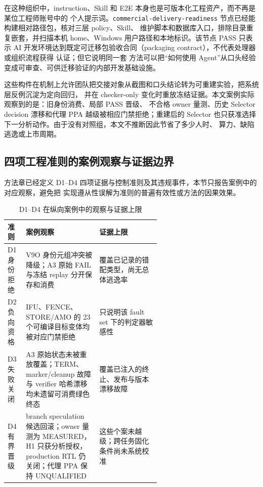 \documentclass[UTF8,a4paper,zihao=-4,oneside]{ctexart}
\begin{document}
在这种组织中，instruction、Skill 和 E2E 本身也是可版本化工程资产，而不再是某位工程师账号中的
个人提示词。\texttt{commercial-delivery-readiness} 节点已经能构建相对路径包，核对三层 policy、Skill、
维护脚本和数据库入口，排除目录重复嵌套，并扫描本机 home、Windows 用户路径和本地标识。该节点 PASS
只表示 AI 开发环境达到既定可迁移包验收合同（packaging contract），不代表处理器或组织流程获得
认证；但它说明同一套
方法可以把“如何使用 Agent”从口头经验变成可审查、可供迁移验证的内部开发基础设施。

这些构件在机制上允许团队把交接对象从截图和口头结论转为可重建实验，把系统层反例沉淀为定向回归，
并在 checker-only 变化时重放冻结证据。本文案例实际观察到的是：旧身份消费、局部 PASS 晋级、
不合格 owner 量测、历史 Selector decision 漂移和代理 PPA 越级被相应门禁拒绝；重建后的 Selector
也只获准选择下一分析动作。由于没有对照组，本文不推断因此节省了多少人时、
算力、缺陷逃逸或上市周期。

\subsection{四项工程准则的案例观察与证据边界}

方法章已经定义 D1--D4 四项证据与控制准则及其违规事件，本节只报告案例中的对应观察，避免把
实现遵从性误解为准则的普遍有效性或方法的因果效果。

\begin{table}[htbp]
  \centering
  \small
  \caption{D1--D4 在纵向案例中的观察与证据上限}
  \label{tab:design-guideline-observations}
  \begin{tabularx}{\linewidth}{@{}L{0.12\linewidth}L{0.48\linewidth}Y@{}}
    \toprule
    准则 & 案例观察 & 证据上限 \\
    \midrule
    D1 身份拒绝 & V9O 身份元组冲突被降级；A3 原始 FAIL 与冻结 replay 分开保存和消费 & 覆盖已记录的错配类型，尚无总体逃逸率 \\
    D2 负向资格 & IFU、FENCE、STORE/AMO 的 23 个可编译目标变体均被对应门禁拒绝 & 只说明该 fault set 下的判定器敏感性 \\
    D3 失败关闭 & A3 原始状态未被重放覆盖；TERM、marker/cleanup 故障与 verifier 哈希漂移均未遗留可消费绿色终态 & 覆盖已注入的终止、发布与版本漂移故障 \\
    D4 有界晋级 & branch speculation 候选回滚；owner 量测为 MEASURED，H1 只获分析授权，production RTL 仍关闭；代理 PPA 保持 UNQUALIFIED & 这些个案未越级；跨任务固化条件尚未系统校准 \\
    \bottomrule
  \end{tabularx}
\end{table}
\end{document}
